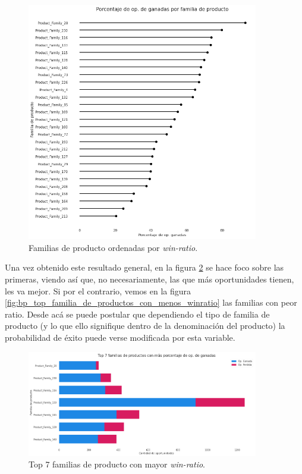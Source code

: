 \documentclass[titlepage,a4paper]{article}
\begin{document}
\begin{figure}[H]
\centering
\includegraphics[width=0.9\textwidth]{images/bp_familia_de_productos_ordenadas_winratio.png}
\cprotect\caption{\label{fig:bp_familia_de_productos_ordenadas_winratio} Familias de producto ordenadas por \textit{win-ratio}. }
\end{figure}

Una vez obtenido este resultado general, en la figura \ref{fig:bp_top_familia_de_productos_con_mas_winratio} se hace foco sobre las primeras, viendo así que, no necesariamente, las que más oportunidades tienen, les va mejor. Si por el contrario, vemos en la figura \ref{fig:bp_top_familia_de_productos_con_menos_winratio} las familias con peor ratio. Desde acá se puede postular que dependiendo el tipo de familia de producto (y lo que ello signifique dentro de la denominación del producto) la probabilidad de éxito puede verse modificada por esta variable.

\begin{figure}[H]
\centering
\includegraphics[width=0.9\textwidth]{images/bp_top_familia_de_productos_con_mas_winratio.png}
\cprotect\caption{\label{fig:bp_top_familia_de_productos_con_mas_winratio} Top 7 familias de producto con mayor \textit{win-ratio}. }
\end{figure}
\end{document}
